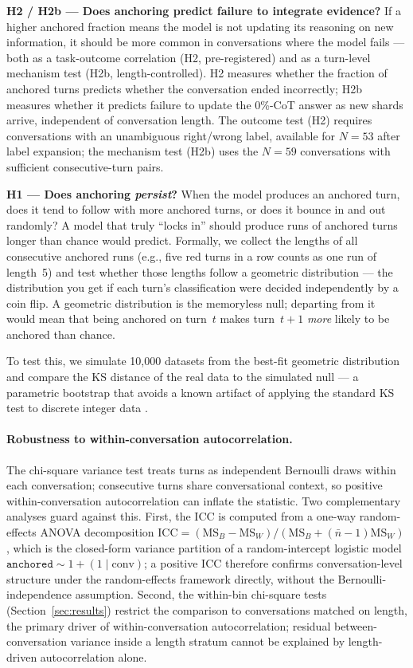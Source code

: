\documentclass{article}
\begin{document}
\bigskip
\noindent\textbf{H2 / H2b --- Does anchoring predict failure to integrate evidence?}
If a higher anchored fraction means the model is not updating its
reasoning on new information, it should be more common in
conversations where the model fails --- both as a task-outcome
correlation (H2, pre-registered) and as a turn-level mechanism
test (H2b, length-controlled).
H2 measures whether the fraction of anchored turns predicts
whether the conversation ended incorrectly; H2b measures whether
it predicts failure to update the 0\%-CoT answer as new shards
arrive, independent of conversation length.
The outcome test (H2) requires conversations with an unambiguous
right/wrong label, available for $N=53$ after label expansion;
the mechanism test (H2b) uses the $N=59$ conversations with
sufficient consecutive-turn pairs.

\bigskip
\noindent\textbf{H1 --- Does anchoring \emph{persist}?}
When the model produces an anchored turn, does it tend to follow
with more anchored turns, or does it bounce in and out randomly?
A model that truly ``locks in'' should produce runs of anchored
turns longer than chance would predict.
Formally, we collect the lengths of all consecutive anchored runs
(e.g., five red turns in a row counts as one run of length~5)
and test whether those lengths follow a geometric distribution
--- the distribution you get if each turn's classification were
decided independently by a coin flip.
A geometric distribution is the memoryless null; departing from
it would mean that being anchored on turn~$t$ makes turn~$t{+}1$
\emph{more} likely to be anchored than chance.

To test this, we simulate 10,000 datasets from the best-fit
geometric distribution and compare the KS distance of the real
data to the simulated null --- a parametric bootstrap that avoids
a known artifact of applying the standard KS test to discrete
integer data \citep{massey1951}.

\paragraph{Robustness to within-conversation autocorrelation.}
The chi-square variance test treats turns as independent
Bernoulli draws within each conversation; consecutive turns
share conversational context, so positive within-conversation
autocorrelation can inflate the statistic.
Two complementary analyses guard against this.
First, the ICC is computed from a one-way random-effects ANOVA
decomposition $\mathrm{ICC} = (\mathrm{MS}_B - \mathrm{MS}_W) / (\mathrm{MS}_B + (\bar{n}-1)\mathrm{MS}_W)$,
which is the closed-form variance partition of a random-intercept
logistic model $\texttt{anchored} \sim 1 + (1\mid\mathrm{conv})$;
a positive ICC therefore confirms conversation-level structure
under the random-effects framework directly, without the
Bernoulli-independence assumption.
Second, the within-bin chi-square tests (Section~\ref{sec:results})
restrict the comparison to conversations matched on length, the
primary driver of within-conversation autocorrelation; residual
between-conversation variance inside a length stratum cannot be
explained by length-driven autocorrelation alone.
\end{document}
